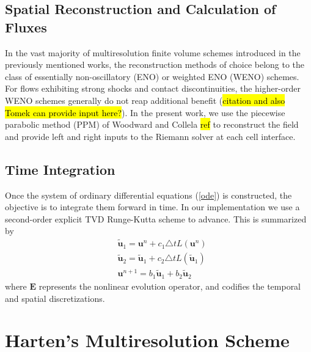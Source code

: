 \documentclass[]{article}
\begin{document}
    \subsection{Spatial Reconstruction and Calculation of Fluxes}

        In the vast majority of multiresolution finite volume schemes 
        introduced in the previously mentioned works, the reconstruction
        methods of choice belong to the class of essentially non-oscillatory
        (ENO) or weighted ENO (WENO) schemes. For flows exhibiting strong
        shocks and contact discontinuities, the higher-order WENO schemes
        generally do not reap additional benefit (\hl{citation and also Tomek
        can provide input here?}). In the present work, we use the piecewise
        parabolic method (PPM) of Woodward and Collela \hl{ref} to reconstruct
        the field and provide left and right inputs to the Riemann solver at
        each cell interface.

    \subsection{Time Integration}

        Once the system of ordinary differential equations (\ref{ode}) is
        constructed, the objective is to integrate them forward in time. In our
        implementation we use a second-order explicit TVD Runge-Kutta scheme to
        advance. This is summarized by
        \begin{align}
            & \tilde{\bm{u}}_{1} = \bm{u}^{n} + c_{1} \triangle t L(\bm{u}^{n}) \\
            & \tilde{\bm{u}}_{2} = \tilde{\bm{u}}_{1} + c_{2} \triangle t L(\tilde{\bm{u}}_{1}) \\
            & \bm{u}^{n+1} = b_{1} \tilde{\bm{u}}_{1} + b_{2} \tilde{\bm{u}}_{2}
        \end{align}
        where $\bm{E}$ represents the nonlinear evolution operator, and codifies the
        temporal and spatial discretizations.

\section{Harten's Multiresolution Scheme}
\end{document}
